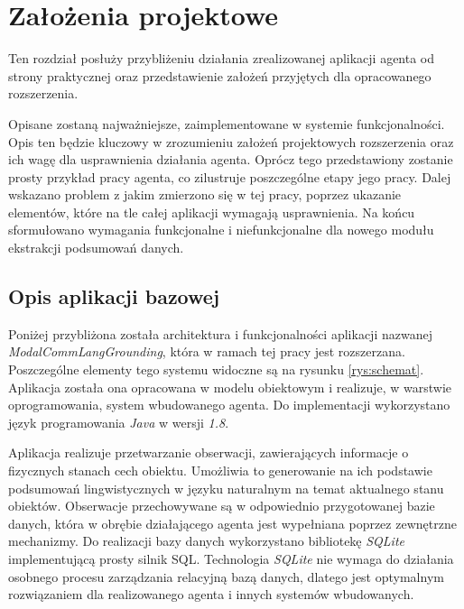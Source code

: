 \chapter{Założenia projektowe}

Ten rozdział posłuży przybliżeniu działania zrealizowanej aplikacji agenta od strony praktycznej oraz przedstawienie założeń przyjętych dla opracowanego rozszerzenia. 

Opisane zostaną najważniejsze, zaimplementowane w systemie funkcjonalności. Opis ten będzie kluczowy w zrozumieniu założeń projektowych rozszerzenia oraz ich wagę dla usprawnienia działania agenta. Oprócz tego przedstawiony zostanie prosty przykład pracy agenta, co zilustruje poszczególne etapy jego pracy. Dalej wskazano problem z jakim zmierzono się w tej pracy, poprzez ukazanie elementów, które na tle całej aplikacji wymagają usprawnienia. Na końcu sformułowano wymagania funkcjonalne i niefunkcjonalne dla nowego modułu ekstrakcji podsumowań danych.


\section{Opis aplikacji bazowej}

Poniżej przybliżona została architektura i funkcjonalności aplikacji nazwanej \textit{ModalCommLangGrounding}, która  w ramach tej pracy jest rozszerzana. Poszczególne elementy tego systemu widoczne są na rysunku \ref{rys:schemat}. Aplikacja została ona opracowana w modelu obiektowym i realizuje, w warstwie oprogramowania, system wbudowanego agenta. Do implementacji wykorzystano język programowania \textit{Java} w wersji \textit{1.8}.

Aplikacja realizuje przetwarzanie obserwacji, zawierających informacje o fizycznych stanach cech obiektu. Umożliwia to generowanie na ich podstawie podsumowań lingwistycznych w języku naturalnym na temat aktualnego stanu obiektów. Obserwacje przechowywane są w odpowiednio przygotowanej bazie danych, która w obrębie działającego agenta jest wypełniana poprzez zewnętrzne mechanizmy. Do realizacji bazy danych wykorzystano bibliotekę \textit{SQLite} implementującą prosty silnik SQL. Technologia \textit{SQLite} nie wymaga do działania osobnego procesu zarządzania relacyjną bazą danych, dlatego jest optymalnym rozwiązaniem dla realizowanego agenta i innych systemów wbudowanych.

